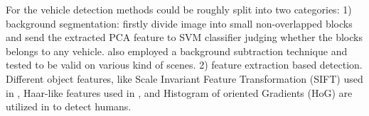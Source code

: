 \documentclass[10pt,twocolumn,letterpaper]{article}  %
\begin{document}
\begin{figure}[!t]
	\centering

	\centering
	
\end{figure}

For the vehicle detection methods could be roughly split into two categories: 1) background segmentation: \cite{zhou2007moving} firstly divide image into small non-overlapped blocks and send the extracted PCA feature to SVM classifier judging whether the blocks belongs to any vehicle.  \cite{xu2016background} also employed a background subtraction technique and tested to be valid on various kind of scenes. 2) feature extraction based detection. Different object features, like Scale Invariant Feature Transformation (SIFT) used in \cite{mu2016multiple}, Haar-like features used in \cite{han2009vehicle}, and Histogram of oriented Gradients (HoG) are utilized in \cite{dalal2005histograms} to detect humans. 
\end{document}
